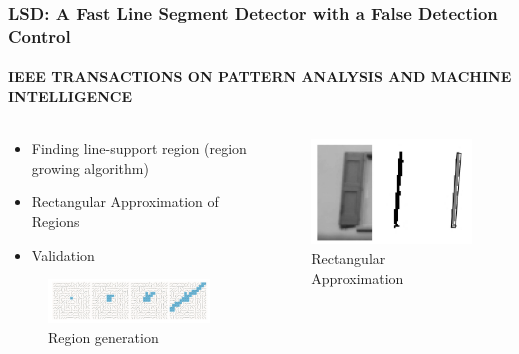 \documentclass{beamer}
\begin{document}
    \begin{frame}
        \frametitle{LSD: A Fast Line Segment Detector with a False Detection Control}
        \framesubtitle{IEEE TRANSACTIONS ON PATTERN ANALYSIS AND MACHINE INTELLIGENCE}
        \begin{columns}
            \begin{column}{.5\linewidth}
                \begin{itemize}
                    \item Finding line-support region (region growing algorithm)
                    \item Rectangular Approximation of Regions
                    \item Validation
                \end{itemize}
                \begin{figure}
                    \includegraphics[width=\linewidth]{pic/region.png}
                    \caption{Region generation}
                \end{figure}
            \end{column}
            \begin{column}{.5\linewidth}
                
                \begin{figure}
                    \includegraphics[width=.5\linewidth]{pic/rect.png}
                    \caption{Rectangular Approximation}
                \end{figure}
            \end{column}
        \end{columns}
    \end{frame}
\end{document}
